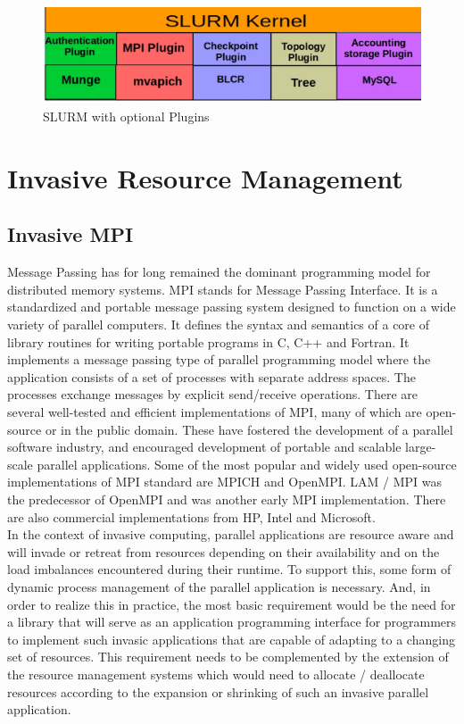 \begin{figure}[h]
\centering
\includegraphics[width=1.0\textwidth]{./figures/plugin.eps}
\vspace{-0.15in}
\caption{SLURM with optional Plugins}
\label{fig:6}
\end{figure}


\section{Invasive Resource Management}
\subsection{Invasive MPI}
Message Passing has for long remained the dominant programming model for distributed memory systems. MPI stands for Message Passing Interface. It is a standardized and portable message passing system designed to function on a wide variety of parallel computers. It defines the syntax and semantics of a core of library routines for writing portable programs in C, C++ and Fortran. It implements a message passing type of parallel programming model where the application consists of a set of processes with separate address spaces. The processes exchange messages by explicit send/receive operations. There are several well-tested and efficient implementations of MPI, many of which are open-source or in the public domain. These have fostered the development of a parallel software industry, and encouraged development of portable and scalable large-scale parallel applications. Some of the most popular and widely used open-source implementations of MPI standard are MPICH and OpenMPI. LAM / MPI was the predecessor of OpenMPI and was another early MPI implementation. There are also commercial implementations from HP, Intel and Microsoft.\\ 

In the context of invasive computing, parallel applications are resource aware and will invade or retreat from resources depending on their availability and on the load imbalances encountered during their runtime. To support this, some form of dynamic process management of the parallel application is necessary. And, in order to realize this in practice, the most basic requirement would be the need for a library that will serve as an application programming interface for programmers to implement such invasic applications that are capable of adapting to a changing set of resources. This requirement needs to be complemented by the extension of the resource management systems which would need to allocate / deallocate resources according to the expansion or shrinking of such an invasive parallel application. \\

